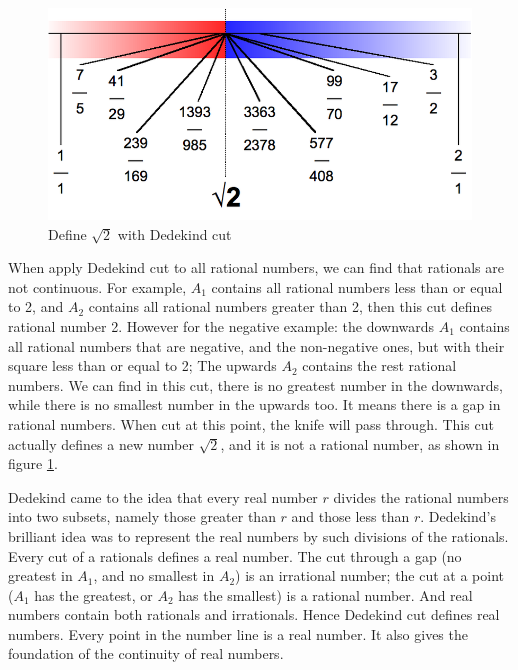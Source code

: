 \documentclass{article}
\begin{document}
\begin{figure}[htbp]
 \centering
 \includegraphics[scale=0.6]{img/Dedekind-cut.png}
 \caption{Define $\sqrt{2}$ with Dedekind cut}
 \label{fig:Dedekind-cut}
\end{figure}

When apply Dedekind cut to all rational numbers, we can find that rationals are not continuous. For example, $A_1$ contains all rational numbers less than or equal to 2, and $A_2$ contains all rational numbers greater than 2, then this cut defines rational number 2. However for the negative example: the downwards $A_1$ contains all rational numbers that are negative, and the non-negative ones, but with their square less than or equal to 2; The upwards $A_2$ contains the rest rational numbers. We can find in this cut, there is no greatest number in the downwards, while there is no smallest number in the upwards too. It means there is a gap in rational numbers. When cut at this point, the knife will pass through. This cut actually defines a new number $\sqrt{2}$, and it is not a rational number, as shown in figure \ref{fig:Dedekind-cut}.

Dedekind came to the idea that every real number $r$ divides the rational numbers into two subsets, namely those greater than $r$ and those less than $r$. Dedekind's brilliant idea was to represent the real numbers by such divisions of the rationals. Every cut of a rationals defines a real number. The cut through a gap (no greatest in $A_1$, and no smallest in $A_2$) is an irrational number; the cut at a point ($A_1$ has the greatest, or $A_2$ has the smallest) is a rational number. And real numbers contain both rationals and irrationals. Hence Dedekind cut defines real numbers. Every point in the number line is a real number. It also gives the foundation of the continuity of real numbers.
\end{document}
